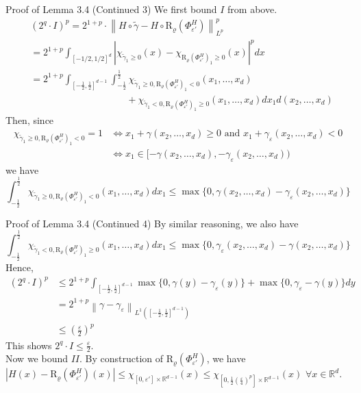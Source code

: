 \documentclass{if-beamer}
\newcommand{\norm}[2]{\left\lVert#1\right\rVert_{#2}}
\begin{document}
\begin{frame}{Proof of Lemma 3.4 (Continued 3)}
    We first bound $I$ from above.\\
    {\small
    \begin{align*}
        &(2^q \cdot I)^p = 2^{1+p}\cdot \norm{H \circ \widetilde{\gamma} - H \circ \mathrm{R}_{\varrho}(\Phi_{\varepsilon'}^H) }{L^p}^p\\
        &= 2^{1+p} \int_{[-1/2,1/2]^d} \left|\chi_{\widetilde{\gamma}_1\geq 0}\left(x\right) - \chi_{\mathrm{R}_{\varrho}(\Phi_{\varepsilon'}^H)_1 \geq 0}\left(x\right)\right|^p dx\\
        &= 2^{1+p} \int_{[-\frac{1}{2},\frac{1}{2}]^{d-1}} \int_{-\frac{1}{2}}^{\frac{1}{2}} \chi_{\widetilde{\gamma}_1\geq 0, \mathrm{R}_{\varrho}(\Phi_{\varepsilon'}^H)_1 < 0}(x_1,\dots,x_d) \\
        & \qquad \qquad \qquad \qquad \qquad + \chi_{\widetilde{\gamma}_1< 0, \mathrm{R}_{\varrho}(\Phi_{\varepsilon'}^H)_1 \geq 0}(x_1,\dots,x_d)dx_1d(x_2,\dots,x_d)
    \end{align*}
    }%
    Then, since 
    {\small
    \begin{align*}
    \chi_{\widetilde{\gamma}_1 \geq 0, \mathrm{R}_{\varrho}(\Phi_{\varepsilon'}^H)_1 < 0} = 1
    &\iff x_1 + \gamma(x_2,\dots,x_d)\geq 0 \text{ and } x_1 + \gamma_{\varepsilon}(x_2,\dots,x_d)<0\\
    &\iff x_1 \in [-\gamma(x_2,\dots,x_d), -\gamma_{\varepsilon}(x_2,\dots,x_d)) 
    \end{align*}
    }%
    we have
    {\small
    $$\int_{-\frac{1}{2}}^{\frac{1}{2}} \chi_{\widetilde{\gamma}_1\geq 0, \mathrm{R}_{\varrho}(\Phi_{\varepsilon'}^H)_1 < 0}(x_1,\dots,x_d) dx_1 \leq \max \{0,\gamma(x_2,\dots,x_d)-\gamma_{\varepsilon}(x_2,\dots,x_d) \}$$
    }%
\end{frame}

\begin{frame}{Proof of Lemma 3.4 (Continued 4)}
    By similar reasoning, we also have
    {\small
    $$\int_{-\frac{1}{2}}^{\frac{1}{2}} \chi_{\widetilde{\gamma}_1< 0, \mathrm{R}_{\varrho}(\Phi_{\varepsilon'}^H)_1 \geq 0}(x_1,\dots,x_d) dx_1 \leq \max \{0,\gamma_{\varepsilon}(x_2,\dots,x_d) - \gamma(x_2,\dots,x_d)\}$$
    }%
    Hence,
    {\small
    \begin{align*}
    (2^q \cdot I)^p &\leq 2^{1+p}\int_{[-\frac{1}{2},\frac{1}{2}]^{d-1}}\max\{0, \gamma(y) - \gamma_{\varepsilon}(y)\} + \max\{0, \gamma_{\varepsilon} - \gamma(y)\}dy\\
    &= 2^{1+p}\norm{\gamma - \gamma_{\varepsilon}}{L^1([-\frac{1}{2}, \frac{1}{2}]^{d-1})}\\
    &\leq \left(\frac{\varepsilon}{2}\right)^p
    \end{align*}
    }%
    This shows $2^q \cdot I \leq \frac{\varepsilon}{2}$.\\
    Now we bound $II$. By construction of $\mathrm{R}_{\varrho}(\Phi_{\varepsilon'}^H)$, we have $|H(x) - \mathrm{R}_{\varrho}(\Phi_{\varepsilon'}^H)(x)| \leq \chi_{[0, \varepsilon'] \times \mathbb{R}^{d-1}}(x) \leq \chi_{[0, \frac{1}{2}(\frac{\varepsilon}{4})^p] \times \mathbb{R}^{d-1}}(x)$ $\forall x \in \mathbb{R}^d$.
\end{frame}
\end{document}
